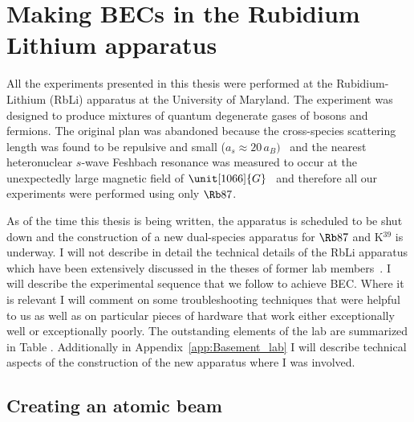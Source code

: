 


\renewcommand{\thechapter}{4}


\chapter{Making BECs in the Rubidium Lithium apparatus}

All the experiments presented in this thesis were performed at the Rubidium-Lithium (RbLi) apparatus at the University of Maryland. The experiment was designed to produce mixtures of quantum degenerate gases of bosons and fermions. The original plan was abandoned because the cross-species scattering length was found to be repulsive and small ($a_s\approx20\,a_B)$~\cite{silber_quantum-degenerate_2005} and the nearest heteronuclear $s$-wave Feshbach resonance was measured to occur at the unexpectedly large magnetic field of $\unit[1066]{G}$~\cite{deh_feshbach_2008} and therefore all our experiments were performed using only $\Rb87$.

As of the time this thesis is being written, the apparatus is scheduled to be shut down and the construction of a new dual-species apparatus for $\Rb87$ and K$^{39}$ is underway. I will not describe in detail the technical details of the RbLi apparatus which have been extensively discussed in the theses of former lab members~\cite{CampbellThesis,PriceThesis}. I will describe the experimental sequence that we follow to achieve BEC. Where it is relevant I will comment on some troubleshooting techniques that were helpful to us as well as on particular pieces of hardware that work either exceptionally well or exceptionally poorly. The outstanding elements of the lab are summarized in Table . Additionally in Appendix~\ref{app:Basement_lab} I will describe technical aspects of the construction of the new apparatus where I was involved. 


\section{Creating an atomic beam}

